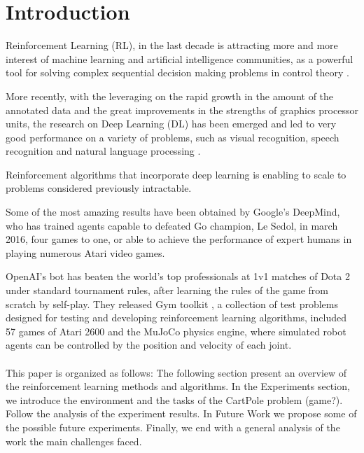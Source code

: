 \section{Introduction}

Reinforcement Learning (RL), in the last decade is attracting more and more interest of machine learning and artificial intelligence communities, as a powerful tool for solving complex sequential decision making problems in control theory \cite{GosaviRLSurvey}.

More recently, with the leveraging on the rapid growth in the amount of the annotated data and the great improvements in the strengths of graphics processor units, the research on  Deep Learning (DL) has been emerged and led to very good performance on a variety of problems, such as visual recognition, speech recognition and natural language processing \cite{AdvancesCNN}.

Reinforcement algorithms that incorporate deep learning is enabling to scale to problems considered previously intractable.

Some of the most amazing results have been obtained by Google’s DeepMind, who has trained agents capable to defeated Go champion, Le Sedol, in march 2016, four games to one, or able to achieve the performance of expert humans in playing numerous Atari video games.

OpenAI's bot has beaten the world's top professionals at 1v1 matches of Dota 2 under standard tournament rules, after learning the rules of the game from scratch by self-play.
They released Gym toolkit \cite{Gym}, a collection of test problems designed for testing and developing reinforcement learning algorithms, included 57 games of Atari 2600 and the MuJoCo physics engine, where simulated robot agents can be controlled by the position and velocity of each joint. 
\\\\
This paper is organized as follows:
The following section present an overview of the reinforcement learning methods and algorithms. In the Experiments section, we introduce the environment and the tasks of the CartPole problem (game?).
Follow the analysis of the experiment results. In Future Work we propose some of the possible future experiments.
Finally, we end with a general analysis of the work the main challenges faced.